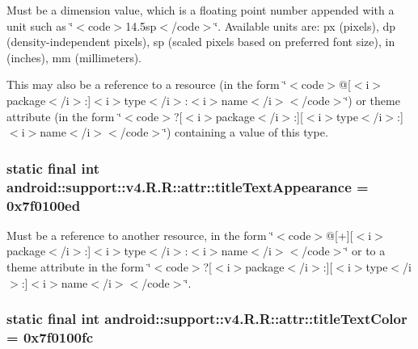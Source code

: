Must be a dimension value, which is a floating point number appended with a unit such as \char`\"{}$<$code$>$14.5sp$<$/code$>$\char`\"{}. Available units are: px (pixels), dp (density-independent pixels), sp (scaled pixels based on preferred font size), in (inches), mm (millimeters). 

This may also be a reference to a resource (in the form \char`\"{}$<$code$>$@\mbox{[}$<$i$>$package$<$/i$>$:\mbox{]}$<$i$>$type$<$/i$>$:$<$i$>$name$<$/i$>$$<$/code$>$\char`\"{}) or theme attribute (in the form \char`\"{}$<$code$>$?\mbox{[}$<$i$>$package$<$/i$>$:\mbox{]}\mbox{[}$<$i$>$type$<$/i$>$:\mbox{]}$<$i$>$name$<$/i$>$$<$/code$>$\char`\"{}) containing a value of this type. \hypertarget{classandroid_1_1support_1_1v4_1_1_r_1_1attr_488c758fbeaf764ce96fb05f39061e6c}{
\subsubsection[{titleTextAppearance}]{\setlength{\rightskip}{0pt plus 5cm}static final int android::support::v4.R.R::attr::titleTextAppearance = 0x7f0100ed}}
\label{classandroid_1_1support_1_1v4_1_1_r_1_1attr_488c758fbeaf764ce96fb05f39061e6c}


Must be a reference to another resource, in the form \char`\"{}$<$code$>$@\mbox{[}+\mbox{]}\mbox{[}$<$i$>$package$<$/i$>$:\mbox{]}$<$i$>$type$<$/i$>$:$<$i$>$name$<$/i$>$$<$/code$>$\char`\"{} or to a theme attribute in the form \char`\"{}$<$code$>$?\mbox{[}$<$i$>$package$<$/i$>$:\mbox{]}\mbox{[}$<$i$>$type$<$/i$>$:\mbox{]}$<$i$>$name$<$/i$>$$<$/code$>$\char`\"{}. \hypertarget{classandroid_1_1support_1_1v4_1_1_r_1_1attr_91a8307c3e8f3188e222aea2540bd64e}{
\subsubsection[{titleTextColor}]{\setlength{\rightskip}{0pt plus 5cm}static final int android::support::v4.R.R::attr::titleTextColor = 0x7f0100fc}}
\label{classandroid_1_1support_1_1v4_1_1_r_1_1attr_91a8307c3e8f3188e222aea2540bd64e}


